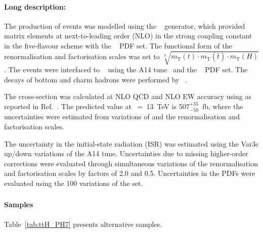 \paragraph{Long description:}

The production of \ttH events was modelled using the
\POWHEGBOX[v2]~\cite{Frixione:2007nw,Nason:2004rx,Frixione:2007vw,Alioli:2010xd,Hartanto:2015uka}
generator, which provided matrix elements at next-to-leading order (NLO) in the strong coupling 
constant \alphas in the five-flavour scheme with the \NNPDF[3.0nlo]~\cite{Ball:2014uwa} PDF set.
The functional form of the renormalisation and factorisation scales was
set to $\sqrt[3]{m_\text{T}(t)\cdot m_\text{T}(\bar{t}) \cdot m_\text{T}(H)}$.
The events were interfaced to \PYTHIA[8.230]~\cite{Sjostrand:2014zea}
using the A14 tune~\cite{ATL-PHYS-PUB-2014-021} and the
\NNPDF[2.3lo]~\cite{Ball:2014uwa} PDF set. The decays of bottom and charm hadrons
were performed by \EVTGEN[1.6.0]~\cite{Lange:2001uf}.

The cross-section was calculated at NLO QCD and NLO EW accuracy using
\MGNLO as reported in Ref.~\cite{deFlorian:2016spz}. The predicted value at \rts~=~\SI{13}{\TeV} is
507$^{+35}_{-50}$~fb, where the uncertainties were estimated from
variations of \alphas and the renormalisation and factorisation scales.

The uncertainty in the initial-state radiation (ISR) was estimated using the Var3c
up/down variations of the A14 tune. Uncertainties due to missing
higher-order corrections were evaluated through simultaneous variations of the
renormalisation and factorisation scales by factors of
2.0 and 0.5. Uncertainties in the PDFs were evaluated using the 100
variations of the \NNPDF[3.0nlo] set.


\subsubsection[Powheg+Herwig7]{\POWHER[7]}

\paragraph{Samples}

Table~\ref{tab:ttH_PH7} presents alternative \ttH samples.

